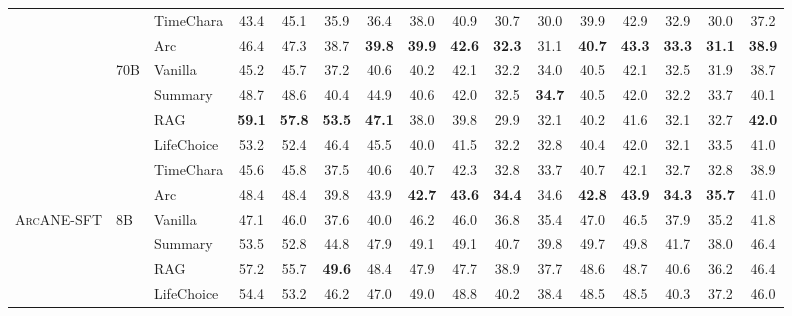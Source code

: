 \documentclass{llmxive}
\providecommand{\ours}{\textsc{ArcANE}}
\begin{document}
\begin{table}[!htbp]
\begin{tabular}{lllccccccccccccc}
 &  & TimeChara & 43.4 & 45.1 & 35.9 & 36.4 & 38.0 & 40.9 & 30.7 & 30.0 & 39.9 & 42.9 & 32.9 & 30.0 & 37.2 \\
 &  & \cellcolor{yellow!15} Arc & \cellcolor{yellow!15} 46.4 & \cellcolor{yellow!15} 47.3 & \cellcolor{yellow!15} 38.7 & \cellcolor{yellow!15} \textbf{39.8} & \cellcolor{yellow!15} \textbf{39.9} & \cellcolor{yellow!15} \textbf{42.6} & \cellcolor{yellow!15} \textbf{32.3} & \cellcolor{yellow!15} 31.1 & \cellcolor{yellow!15} \textbf{40.7} & \cellcolor{yellow!15} \textbf{43.3} & \cellcolor{yellow!15} \textbf{33.3} & \cellcolor{yellow!15} \textbf{31.1} & \cellcolor{yellow!15} \textbf{38.9} \\
\cmidrule(l){2-16}
 & \multirow[t]{6}{*}{70B} & Vanilla & 45.2 & 45.7 & 37.2 & 40.6 & 40.2 & 42.1 & 32.2 & 34.0 & 40.5 & 42.1 & 32.5 & 31.9 & 38.7 \\
 &  & Summary & 48.7 & 48.6 & 40.4 & 44.9 & 40.6 & 42.0 & 32.5 & \textbf{34.7} & 40.5 & 42.0 & 32.2 & 33.7 & 40.1 \\
 &  & RAG & \textbf{59.1} & \textbf{57.8} & \textbf{53.5} & \textbf{47.1} & 38.0 & 39.8 & 29.9 & 32.1 & 40.2 & 41.6 & 32.1 & 32.7 & \textbf{42.0} \\
 &  & LifeChoice & 53.2 & 52.4 & 46.4 & 45.5 & 40.0 & 41.5 & 32.2 & 32.8 & 40.4 & 42.0 & 32.1 & 33.5 & 41.0 \\
 &  & TimeChara & 45.6 & 45.8 & 37.5 & 40.6 & 40.7 & 42.3 & 32.8 & 33.7 & 40.7 & 42.1 & 32.7 & 32.8 & 38.9 \\
 &  & \cellcolor{yellow!15} Arc & \cellcolor{yellow!15} 48.4 & \cellcolor{yellow!15} 48.4 & \cellcolor{yellow!15} 39.8 & \cellcolor{yellow!15} 43.9 & \cellcolor{yellow!15} \textbf{42.7} & \cellcolor{yellow!15} \textbf{43.6} & \cellcolor{yellow!15} \textbf{34.4} & \cellcolor{yellow!15} 34.6 & \cellcolor{yellow!15} \textbf{42.8} & \cellcolor{yellow!15} \textbf{43.9} & \cellcolor{yellow!15} \textbf{34.3} & \cellcolor{yellow!15} \textbf{35.7} & \cellcolor{yellow!15} 41.0 \\
\midrule
\multirow[t]{12}{*}{\ours{}-SFT} & \multirow[t]{6}{*}{8B} & Vanilla & 47.1 & 46.0 & 37.6 & 40.0 & 46.2 & 46.0 & 36.8 & 35.4 & 47.0 & 46.5 & 37.9 & 35.2 & 41.8 \\
 &  & Summary & 53.5 & 52.8 & 44.8 & 47.9 & 49.1 & 49.1 & 40.7 & 39.8 & 49.7 & 49.8 & 41.7 & 38.0 & 46.4 \\
 &  & RAG & 57.2 & 55.7 & \textbf{49.6} & 48.4 & 47.9 & 47.7 & 38.9 & 37.7 & 48.6 & 48.7 & 40.6 & 36.2 & 46.4 \\
 &  & LifeChoice & 54.4 & 53.2 & 46.2 & 47.0 & 49.0 & 48.8 & 40.2 & 38.4 & 48.5 & 48.5 & 40.3 & 37.2 & 46.0 \\

\end{tabular}
\end{table}
\end{document}
